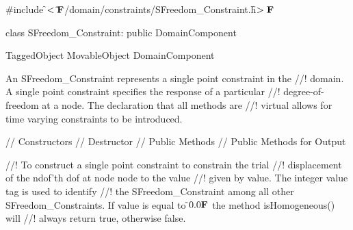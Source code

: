 
\indent \#include \f$<\tilde{ }{\bf F}$/domain/constraints/SFreedom\_Constraint.h\f$>{\bf F}$

\indent class SFreedom\_Constraint: public DomainComponent

\indent TaggedObject
\indent MovableObject
\indent\indent DomainComponent
\indent\indent{}

\indent An SFreedom\_Constraint represents a single point constraint in the
//! domain. A single point constraint specifies the response of a particular
//! degree-of-freedom at a node. The declaration that all methods are
//! virtual allows for time varying constraints to be introduced.

\indent\indent // Constructors
\indent{}
\indent{} 
\indent{}
\indent\indent // Destructor
\indent{}
\indent\indent // Public Methods
\indent{}
\indent{}
\indent{} 
\indent{}
\indent{} 
\indent{}
\indent{}
\indent\indent // Public Methods for Output
\indent{} 
\indent{} 
\indent{}


//! To construct a single point constraint to constrain the trial
//! displacement of the \p ndof'th dof at node \p node to the value
//! given by \p value. The integer value \p tag is used to identify
//! the SFreedom\_Constraint among all other SFreedom\_Constraints. If
\p value is equal to \f$0.0{\bf F}$ the method isHomogeneous() will
//! always return \p true, otherwise \p false. 

